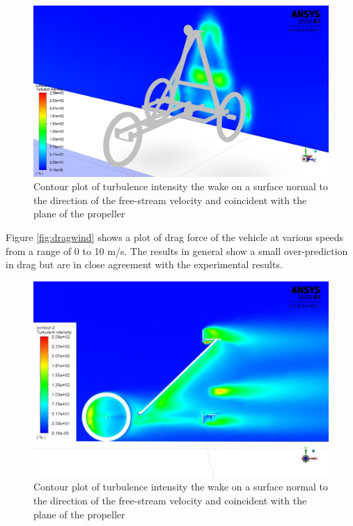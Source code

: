 \begin{figure}[!htbp]
    \centering
    \includegraphics[width=0.8\linewidth]{images/part10.1/vehicleiso.jpg}
    \caption{Contour plot of turbulence intensity the wake on a surface normal to the direction of the free-stream velocity and coincident with the plane of the propeller}
    \label{fig:vehicleiso}
\end{figure}

Figure \ref{fig:dragwind} shows a plot of drag force of the vehicle at various speeds from a range of 0 to 10 m/s. The results in general show a small over-prediction in drag but are in close agreement with the experimental results. 

\begin{figure}[!htbp]
    \centering
    \includegraphics[width=0.8\linewidth]{images/part10.1/vehicleside.jpg}
    \caption{Contour plot of turbulence intensity the wake on a surface normal to the direction of the free-stream velocity and coincident with the plane of the propeller}
    \label{fig:vehicleside}
\end{figure}

